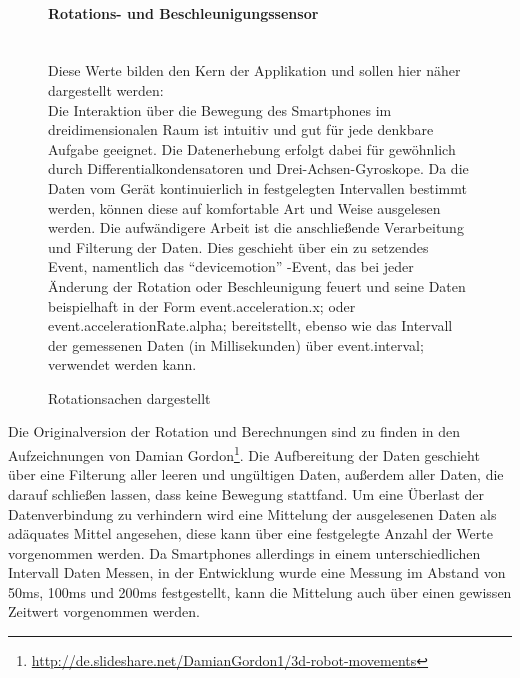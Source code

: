 \documentclass[a4paper]{spie}  %
\begin{document}
\begin{figure}[H]
	\begin{minipage}[t]{0.4\textwidth}
		\vspace{0pt}
		\paragraph{Rotations- und Beschleunigungssensor}\mbox{}\\
Diese Werte bilden den Kern der Applikation und sollen hier näher dargestellt werden:\\
Die Interaktion über die Bewegung des Smartphones im dreidimensionalen Raum ist intuitiv und gut für jede denkbare Aufgabe geeignet. Die Datenerhebung erfolgt dabei für gewöhnlich durch Differentialkondensatoren und Drei-Achsen-Gyroskope.
Da die Daten vom Gerät kontinuierlich in festgelegten Intervallen bestimmt werden, können diese auf komfortable Art und Weise ausgelesen werden. Die aufwändigere Arbeit ist die anschließende Verarbeitung und Filterung der Daten. Dies geschieht über ein zu setzendes Event, namentlich das \enquote{devicemotion} -Event, das bei jeder Änderung der Rotation oder Beschleunigung feuert und seine Daten beispielhaft in der Form event.acceleration.x; oder event.accelerationRate.alpha; bereitstellt, ebenso wie das Intervall der gemessenen Daten (in Millisekunden) über event.interval; verwendet werden kann.
	\end{minipage}
	\hfill
	\begin{minipage}[t]{0.5\textwidth}
		\vspace{0pt}
		\caption{Rotationsachen dargestellt}
		\label{fig:test2}
	\end{minipage}
\end{figure}
Die Originalversion der Rotation und Berechnungen sind zu finden in den Aufzeichnungen von Damian Gordon\footnote{\url{http://de.slideshare.net/DamianGordon1/3d-robot-movements}}.
Die Aufbereitung der Daten geschieht über eine Filterung aller leeren und ungültigen Daten, außerdem aller Daten, die darauf schließen lassen, dass keine Bewegung stattfand. Um eine Überlast der Datenverbindung zu verhindern wird eine Mittelung der ausgelesenen Daten als adäquates Mittel angesehen, diese kann über eine festgelegte Anzahl der Werte vorgenommen werden. Da Smartphones allerdings in einem unterschiedlichen Intervall Daten Messen, in der Entwicklung wurde eine Messung im Abstand von 50ms, 100ms und 200ms festgestellt, kann die Mittelung auch über einen gewissen Zeitwert vorgenommen werden.
\end{document}

